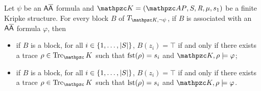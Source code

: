 \begin{theorem*}[\ref{th:cx}]
Let $\psi$  be an $\mathsf{A\overline{A}}$ formula and  $\Ku=(\Prop,\States,\Edges,\Lab,s_1)$ be a finite Kripke structure.
For every block $B$ of $T_{\Ku,\neg\psi}$,
if $B$ is associated with an $\mathsf{A\overline{A}}$ formula $\varphi$, then
\begin{itemize}
	\item if $B$ is a \forw{} block, for all $i\in\{1,\ldots,|S|\}$, $B(z_i)=\top$ if and only if there exists a trace $\rho\in\Trk_\Ku$ such that $\operatorname{fst}(\rho)=s_i$ and $\Ku,\rho\models\varphi$;
	\item if $B$ is a \back{} block, for all $i\in\{1,\ldots,|S|\}$, $B(z_i)=\top$ if and only if there exists a trace $\rho\in\Trk_\Ku$ such that $\operatorname{lst}(\rho)=s_i$ and $\Ku,\rho\models\varphi$.
\end{itemize}
\end{theorem*}

